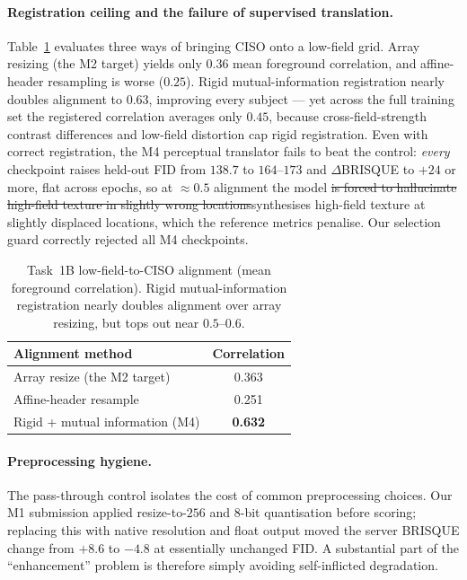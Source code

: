 \documentclass[runningheads]{llncs}
\newcommand{\addtwo}[1]{\textcolor{revtwo}{#1}}
\newcommand{\deltwo}[1]{\textcolor{revtwo}{\sout{#1}}}
\begin{document}
\paragraph{Registration ceiling and the failure of supervised translation.}
Table~\ref{tab:reg} evaluates three ways of bringing CISO onto a low-field grid.
Array resizing (the M2 target) yields only $0.36$ mean foreground correlation,
and affine-header resampling is worse ($0.25$). Rigid mutual-information
registration nearly doubles alignment to $0.63$, improving every subject --- yet
across the full training set the registered correlation averages only $0.45$,
because cross-field-strength contrast differences and low-field distortion cap
rigid registration. Even with correct registration, the M4 perceptual translator
fails to beat the control: \emph{every} checkpoint raises held-out FID from
$138.7$ to $164$--$173$ and $\Delta$BRISQUE to $+24$ or more, flat across epochs,
so at $\approx0.5$ alignment the model \deltwo{is forced to hallucinate
high-field texture in slightly wrong locations}\addtwo{synthesises high-field texture
at slightly displaced locations, which the reference metrics penalise}. Our selection guard correctly rejected all M4
checkpoints.

\begin{table}[htbp]
\caption{Task~1B low-field-to-CISO alignment (mean foreground correlation).
Rigid mutual-information registration nearly doubles alignment over array
resizing, but tops out near $0.5$--$0.6$.}
\label{tab:reg}
\centering
\small
\begin{tabular}{lc}
\toprule
Alignment method & Correlation \\
\midrule
Array resize (the M2 target)        & 0.363 \\
Affine-header resample              & 0.251 \\
Rigid + mutual information (M4)     & \textbf{0.632} \\
\bottomrule
\end{tabular}
\end{table}

\paragraph{Preprocessing hygiene.}
The pass-through control isolates the cost of common preprocessing choices. Our
M1 submission applied resize-to-$256$ and 8-bit quantisation before scoring;
replacing this with native resolution and float output moved the server BRISQUE
change from $+8.6$ to $-4.8$ at essentially unchanged FID. A substantial part of
the ``enhancement'' problem is therefore simply avoiding self-inflicted
degradation.
\end{document}
